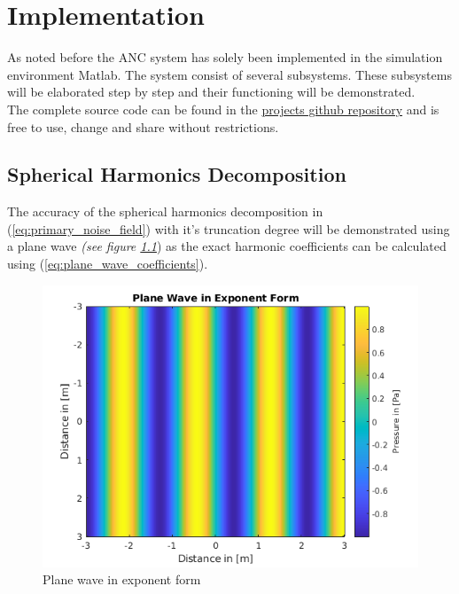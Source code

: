 \chapter{Implementation}

As noted before the ANC system has solely been implemented in the simulation environment Matlab. The system consist of several subsystems. These subsystems will be elaborated step by step and their functioning will be demonstrated.\\
The complete source code can be found in the \color{blue}\href{https://github.com/leonardberresheim/MA---Active-Noise-Control-in-Spatial-Domains/tree/main/Matlab}{projects github repository} \color{black} and is free to use, change and share without restrictions.



\section{Spherical Harmonics Decomposition}
The accuracy of the spherical harmonics decomposition in (\ref{eq:primary_noise_field}) with it's truncation degree will be demonstrated using a plane wave \textit{(see figure \ref{fig:planeWaveExp}}) as the exact harmonic coefficients can be calculated using (\ref{eq:plane_wave_coefficients}).
\begin{figure}
    \centerline{\includegraphics{LaTeX/images/plots/plane_Wave_exponent_form.png}}
    \caption{Plane wave in exponent form}
    \label{fig:planeWaveExp}
\end{figure}

